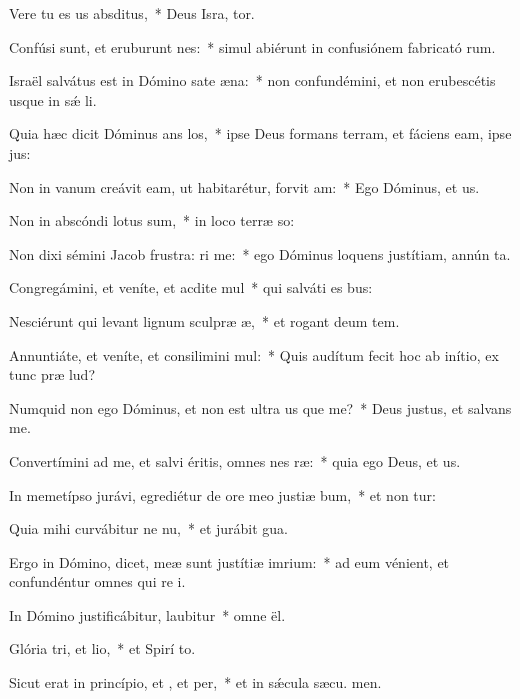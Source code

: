 \item Vere tu es us absditus,~* Deus Isra, tor.
\item Confúsi sunt, et eruburunt nes:~* simul abiérunt in confusiónem fabricató rum.
\item Israël salvátus est in Dómino sate æna:~* non confundémini, et non erubescétis usque in sǽ li.
\item Quia hæc dicit Dóminus ans los,~* ipse Deus formans terram, et fáciens eam, ipse  jus:
\item Non in vanum creávit eam, ut habitarétur, forvit am:~* Ego Dóminus, et   us.
\item Non in abscóndi lotus sum,~* in loco terræ so:
\item Non dixi sémini Jacob frustra: ri me:~* ego Dóminus loquens justítiam, annún ta.
\item Congregámini, et veníte, et acdite mul~* qui salváti es  bus:
\item Nesciérunt qui levant lignum sculpræ æ,~* et rogant deum  tem.
\item Annuntiáte, et veníte, et consilimini mul:~* Quis audítum fecit hoc ab inítio, ex tunc præ lud?
\item Numquid non ego Dóminus, et non est ultra us que me?~* Deus justus, et salvans    me.
\item Convertímini ad me, et salvi éritis, omnes nes ræ:~* quia ego Deus, et   us.
\item In memetípso jurávi, egrediétur de ore meo justiæ bum,~* et non tur:
\item Quia mihi curvábitur ne nu,~* et jurábit  gua.
\item Ergo in Dómino, dicet, meæ sunt justítiæ  imrium:~* ad eum vénient, et confundéntur omnes qui re i.
\item In Dómino justificábitur,  laubitur~* omne  ël.
\item Glória tri, et lio,~* et Spirí to.
\item Sicut erat in princípio, et , et per,~* et in sǽcula sæcu. men.
